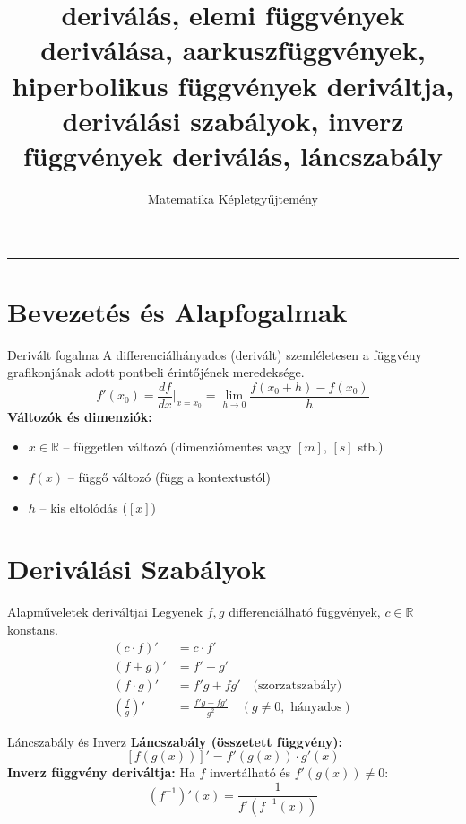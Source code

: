 \documentclass[10pt,a4paper,twocolumn]{article}
\title{deriválás, elemi függvények deriválása, aarkuszfüggvények, hiperbolikus függvények deriváltja, deriválási szabályok, inverz függvények deriválás, láncszabály}
\author{Matematika Képletgyűjtemény}
\date{}
\begin{document}
\maketitle
\vspace{-1em}
\noindent\rule{\linewidth}{0.5pt}

\section{Bevezetés és Alapfogalmak}

\begin{fogalombox}{Derivált fogalma}
A differenciálhányados (derivált) szemléletesen a függvény grafikonjának adott pontbeli érintőjének meredeksége.
\[ f'(x_0) = \frac{df}{dx}\Big|_{x=x_0} = \lim_{h \to 0} \frac{f(x_0+h) - f(x_0)}{h} \]
\textbf{Változók és dimenziók:}
\begin{itemize}
    \item $x \in \mathbb{R}$ – független változó (dimenziómentes vagy $[m]$, $[s]$ stb.)
    \item $f(x)$ – függő változó (függ a kontextustól)
    \item $h$ – kis eltolódás ($[x]$)
\end{itemize}
\end{fogalombox}

\section{Deriválási Szabályok}

\begin{fogalombox}{Alapműveletek deriváltjai}
Legyenek $f, g$ differenciálható függvények, $c \in \mathbb{R}$ konstans.
\begin{align*}
    (c \cdot f)' &= c \cdot f' \\
    (f \pm g)' &= f' \pm g' \\
    (f \cdot g)' &= f'g + fg' \quad \text{(szorzatszabály)} \\
    \left(\frac{f}{g}\right)' &= \frac{f'g - fg'}{g^2} \quad (g \neq 0, \text{ hányados})
\end{align*}
\end{fogalombox}

\begin{fogalombox}{Láncszabály és Inverz}
\textbf{Láncszabály (összetett függvény):}
\[ [f(g(x))]' = f'(g(x)) \cdot g'(x) \]
\textbf{Inverz függvény deriváltja:}
Ha $f$ invertálható és $f'(g(x)) \neq 0$:
\[ (f^{-1})'(x) = \frac{1}{f'(f^{-1}(x))} \]
\end{fogalombox}
\end{document}

